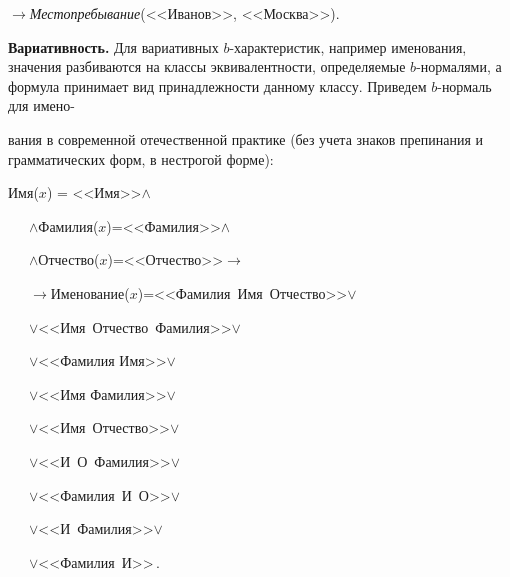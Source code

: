 \begin{multicols}{2}
\hspace*{5mm}$\rightarrow$\;\textit{Местопребывание}(<<Иванов>>, <<Москва>>).

\smallskip
  
 
 \textbf{Вариативность.} Для вариативных $b$-ха\-рак\-те\-ри\-стик, например 
именования, значения разбиваются на классы эквивалентности, определяемые 
$b$-нор\-ма\-ля\-ми, а формула принимает вид принадлежности данному классу. 
Приведем $b$-нор\-маль для имено-\linebreak\vspace*{-12pt}

\pagebreak

\noindent
вания в современной отечественной практике 
(без учета знаков препинания и грамматических форм, в нестрогой форме):


\smallskip

\noindent
Имя($x$) = <<Имя>>\;$\wedge$\; %

\noindent
\ \ \ $\wedge$\;Фамилия($x$)\;=\;<<Фамилия>>\;$\wedge$ %

\noindent
\ \ \ $\wedge$\;Отчество($x$)\;=\;<<Отчество>>\;$\rightarrow$ %

\noindent
\ \ \ $\rightarrow$\;Именование($x$)\;=\;<<Фамилия\ Имя\ Отчество>>\;$\vee$ %

\noindent
\ \ \ $\vee$\;<<Имя\  Отчество\ Фамилия>>\;$\vee$ %

\noindent
\ \ \ $\vee$\;<<Фамилия Имя>>\;$\vee$ %

\noindent
\ \ \ $\vee$\;<<Имя Фамилия>>\;$\vee$ %

\noindent
\ \ \ $\vee$\;<<Имя\ Отчество>>\;$\vee$ %

\noindent
\ \ \ $\vee$\;<<И\ О\ Фамилия>>\;$\vee$ %

\noindent
\ \ \ $\vee$\;<<Фамилия\ И\ О>>\;$\vee$

\noindent
\ \ \ $\vee$\;<<И\ Фамилия>>\;$\vee$

\noindent
\ \ \ $\vee$\;<<Фамилия\ И>>\,. 



\end{multicols}
